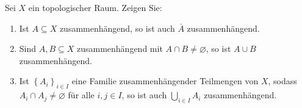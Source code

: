 \begin{assignment}
  Sei \( X \) ein topologischer Raum. Zeigen Sie:
  \begin{enumerate}[label=(\alph*)]
    \item Ist \( A \subseteq X \) zusammenhängend, so ist auch \( \overline{A} \) zusammenhängend.
    \item Sind \( A,B \subseteq X \) zusammenhängend mit \( A \cap B \neq \varnothing \), so ist \( A \cup B \) zusammenhängend.
    \item Ist \( {\left \{ A_i \right \}}_{i \in I} \) eine Familie zusammenhängender Teilmengen von \( X \), sodass \( A_i \cap A_j \neq \varnothing \) für alle \( i, j \in I \), so ist auch \( \bigcup_{i \in I} A_i \) zusammenhängend.
  \end{enumerate}
\end{assignment}
